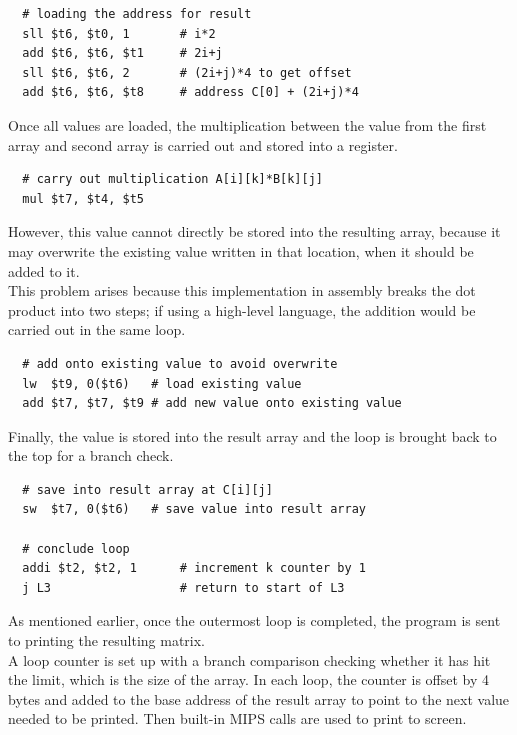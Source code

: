 \documentclass[twocolumn]{article}
\begin{document}
\begin{verbatim}
  # loading the address for result
  sll $t6, $t0, 1       # i*2
  add $t6, $t6, $t1     # 2i+j
  sll $t6, $t6, 2       # (2i+j)*4 to get offset 
  add $t6, $t6, $t8     # address C[0] + (2i+j)*4
\end{verbatim}

Once all values are loaded, the multiplication between the value from the first array and second array is carried out and stored into a register.  

\begin{verbatim}
  # carry out multiplication A[i][k]*B[k][j]
  mul $t7, $t4, $t5
\end{verbatim}

However, this value cannot directly be stored into the resulting array, because it may overwrite the existing value written in that location, when it should be added to it. \\

This problem arises because this implementation in assembly breaks the dot product into two steps; if using a high-level language, the addition would be carried out in the same loop. 

\begin{verbatim}
  # add onto existing value to avoid overwrite
  lw  $t9, 0($t6)	# load existing value 
  add $t7, $t7, $t9	# add new value onto existing value
\end{verbatim}

Finally, the value is stored into the result array and the loop is brought back to the top for a branch check. 

\begin{verbatim}
  # save into result array at C[i][j]
  sw  $t7, 0($t6)	# save value into result array

  # conclude loop
  addi $t2, $t2, 1      # increment k counter by 1
  j L3                  # return to start of L3
\end{verbatim}

As mentioned earlier, once the outermost loop is completed, the program is sent to printing the resulting matrix. \\

A loop counter is set up with a branch comparison checking whether it has hit the limit, which is the size of the array. In each loop, the counter is offset by 4 bytes and added to the base address of the result array to point to the next value needed to be printed. Then built-in MIPS calls are used to print to screen.
\end{document}

